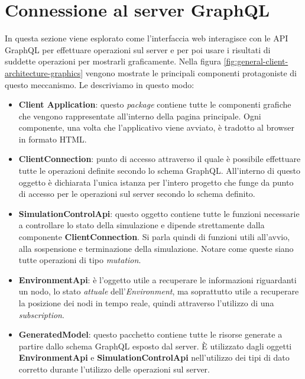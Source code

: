 \section{Connessione al server GraphQL}
In questa sezione viene esplorato come l'interfaccia web interagisce con le \ac{API} GraphQL per effettuare operazioni sul server e per poi usare i risultati di suddette operazioni per mostrarli graficamente. Nella figura \ref{fig:general-client-architecture-graphics} vengono mostrate le principali componenti protagoniste di questo meccanismo. Le descriviamo in questo modo:

\begin{itemize}
	\item \textbf{Client Application}: questo \textit{package} contiene tutte le componenti grafiche che vengono rappresentate all'interno della pagina principale. Ogni componente, una volta che l'applicativo viene avviato, è tradotto al browser in formato HTML.
	\item \textbf{ClientConnection}: punto di accesso attraverso il quale è possibile effettuare tutte le operazioni definite secondo lo schema GraphQL. All'interno di questo oggetto è dichiarata l'unica istanza per l'intero progetto che funge da punto di accesso per le operazioni sul server secondo lo schema definito. 
	\item \textbf{SimulationControlApi}: questo oggetto contiene tutte le funzioni necessarie a controllare lo stato della simulazione e dipende strettamente dalla componente \textbf{ClientConnection}. Si parla quindi di funzioni utili all'avvio, alla sospensione e terminazione della simulazione. Notare come queste siano tutte operazioni di tipo \textit{mutation}.
	\item \textbf{EnvironmentApi}: è l'oggetto utile a recuperare le informazioni riguardanti un nodo, lo stato \textit{attuale} dell'\textit{Environment}, ma soprattutto utile a recuperare la posizione dei nodi in tempo reale, quindi attraverso l'utilizzo di una \textit{subscription}. 
	\item \textbf{GeneratedModel}: questo pacchetto contiene tutte le risorse generate a partire dallo schema GraphQL esposto dal server. È utilizzato dagli oggetti \textbf{EnvironmentApi} e \textbf{SimulationControlApi} nell'utilizzo dei tipi di dato corretto durante l'utilizzo delle operazioni sul server.
\end{itemize}

